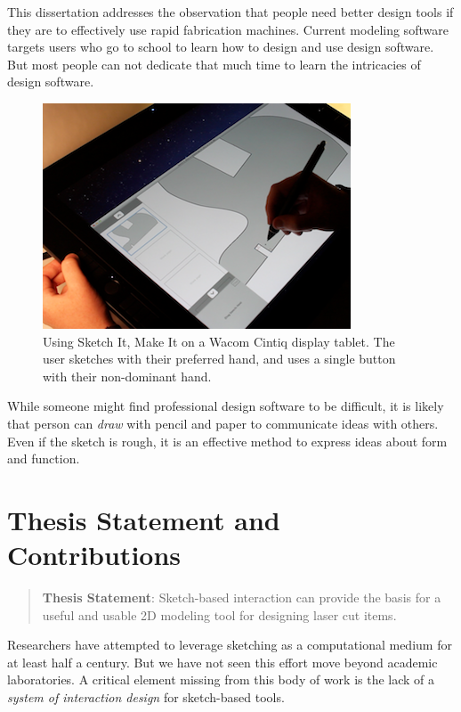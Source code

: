 This dissertation addresses the observation that people need better
design tools if they are to effectively use rapid fabrication
machines. Current modeling software targets users who go to school to
learn how to design and use design software. But most people can not
dedicate that much time to learn the intricacies of design software.

\begin{figure}[t]
  \centering
  \includegraphics[width=0.9\linewidth]{img/simi-with-cintiq.png}
  \caption[SIMI on a Wacom Cintiq]{Using Sketch It, Make It on a Wacom
    Cintiq display tablet. The user sketches with their preferred
    hand, and uses a single button with their non-dominant hand.}
  \label{fig:simi-intro}
\end{figure}

While someone might find professional design software to be difficult,
it is likely that person can \textit{draw} with pencil and paper to
communicate ideas with others. Even if the sketch is rough, it is an
effective method to express ideas about form and function.

\section{Thesis Statement and Contributions} 

\begin{quote}
\textbf{Thesis Statement}: Sketch-based interaction can provide the
basis for a useful and usable 2D modeling tool for designing laser cut
items.
\end{quote}

Researchers have attempted to leverage sketching as a computational
medium for at least half a century. But we have not seen this effort
move beyond academic laboratories. A critical element missing from
this body of work is the lack of a \textit{system of interaction
  design} for sketch-based tools.

